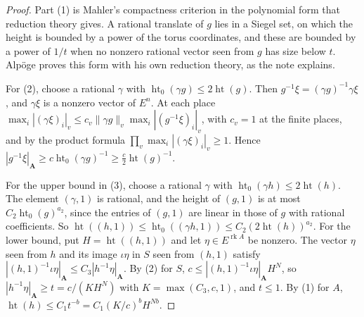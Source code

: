 \begin{proof}
Part (1) is Mahler's compactness criterion \cite{Bor69} in the polynomial form
that reduction theory gives. A rational translate of $g$ lies in a Siegel set,
on which the height is bounded by a power of the torus coordinates, and these
are bounded by a power of $1/t$ when no nonzero rational vector seen from $g$
has size below $t$. Alpöge proves this form with his own reduction theory, as
the note explains.

For (2), choose a rational $\gamma$ with
$\operatorname{ht}_0(\gamma g)\leq2\operatorname{ht}(g)$. Then
$g^{-1}\xi=(\gamma g)^{-1}\gamma\xi$, and $\gamma\xi$ is a nonzero vector of
$E^n$. At each place
$\max_i|(\gamma\xi)_i|_v\leq c_v\|\gamma g\|_v\max_i|(g^{-1}\xi)_i|_v$, with
$c_v=1$ at the finite places, and by the product formula
$\prod_v\max_i|(\gamma\xi)_i|_v\geq1$. Hence
$|g^{-1}\xi|_{\mathbf A}\geq c\operatorname{ht}_0(\gamma g)^{-1}\geq
\tfrac c2\operatorname{ht}(g)^{-1}$.

For the upper bound in (3), choose a rational $\gamma$ with
$\operatorname{ht}_0(\gamma h)\leq2\operatorname{ht}(h)$. The element
$(\gamma,1)$ is rational, and the height of $(g,1)$ is at most
$C_2\operatorname{ht}_0(g)^{a_2}$, since the entries of $(g,1)$ are linear in
those of $g$ with rational coefficients. So
$\operatorname{ht}((h,1))\leq\operatorname{ht}_0((\gamma h,1))\leq
C_2(2\operatorname{ht}(h))^{a_2}$. For the lower bound, put
$H=\operatorname{ht}((h,1))$ and let $\eta\in E^{\operatorname{rk}A}$ be nonzero.
The vector $\eta$ seen from $h$ and its image $\iota\eta$ in $S$ seen from
$(h,1)$ satisfy $|(h,1)^{-1}\iota\eta|_{\mathbf A}\leq C_3|h^{-1}\eta|_{\mathbf A}$.
By (2) for $S$, $c\leq|(h,1)^{-1}\iota\eta|_{\mathbf A}H^N$, so
$|h^{-1}\eta|_{\mathbf A}\geq t=c/(KH^N)$ with $K=\max(C_3,c,1)$, and $t\leq1$.
By (1) for $A$, $\operatorname{ht}(h)\leq C_1t^{-b}=C_1(K/c)^bH^{Nb}$.


\end{proof}
